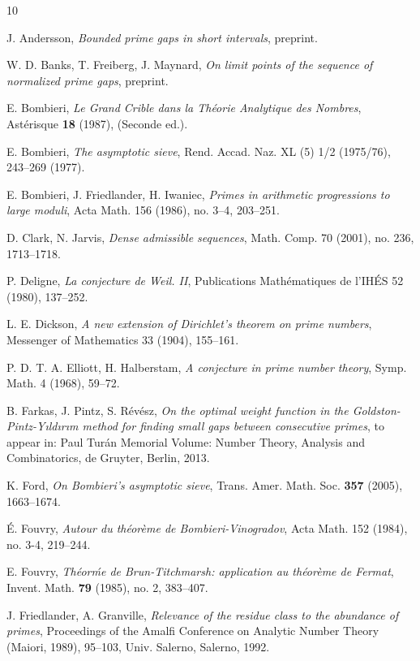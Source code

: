 

\begin{thebibliography}{10}

J. Andersson, \emph{Bounded prime gaps in short intervals}, preprint.

W. D. Banks, T. Freiberg, J. Maynard, \emph{On limit points of the sequence of normalized prime gaps}, preprint.

E. Bombieri, \emph{Le Grand Crible dans la Th\'eorie Analytique des Nombres}, Ast\'erisque \textbf{18} (1987), (Seconde ed.). 

E. Bombieri, \emph{The asymptotic sieve}, Rend. Accad. Naz. XL (5)
1/2 (1975/76), 243--269 (1977). 

 E. Bombieri, J. Friedlander, H. Iwaniec, \emph{Primes in
    arithmetic progressions to large moduli}, Acta Math. 156
  (1986), no. 3--4, 203--251.

D. Clark, N. Jarvis, \emph{Dense admissible sequences}, Math. Comp. 70 (2001), no. 236, 1713--1718.

P. Deligne, \emph{La conjecture de Weil. II}, Publications Math\'ematiques de l'IH\'ES 52 (1980), 137--252.

L. E. Dickson, \emph{A new extension of Dirichlet's theorem on prime numbers}, Messenger of Mathematics 33 (1904), 155--161.

 P. D. T. A. Elliott, H. Halberstam, \emph{A
    conjecture in prime number theory}, Symp. Math. 4 (1968), 59--72.

 B. Farkas, J. Pintz, S. R\'ev\'esz, \emph{On the
    optimal weight function in the Goldston-Pintz-Y{\i}ld{\i}r{\i}m
    method for finding small gaps between consecutive primes}, to
  appear in: Paul Tur\'an Memorial Volume: Number Theory, Analysis and
  Combinatorics, de Gruyter, Berlin, 2013.

K. Ford, \emph{On Bombieri's asymptotic sieve}, Trans. Amer. Math. Soc. \textbf{357} (2005), 1663--1674.

 \'E. Fouvry, \emph{Autour du th\'eor\`eme de
    Bombieri-Vinogradov}, Acta Math. 152 (1984), no. 3-4,
  219--244.

E. Fouvry, \emph{Th\'eor\'me de Brun-Titchmarsh: application au th\'eor\`eme de Fermat}, Invent. Math. \textbf{79} (1985), no. 2, 383--407.


  J. Friedlander, A. Granville, \emph{Relevance of the
     residue class to the abundance of primes}, Proceedings of the
   Amalfi Conference on Analytic Number Theory (Maiori, 1989),
   95--103, Univ. Salerno, Salerno, 1992.


\end{thebibliography}
